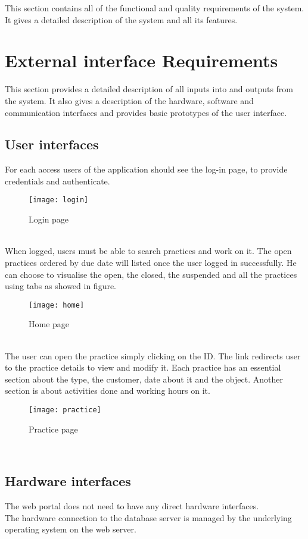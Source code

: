 \documentclass[../main.tex]{subfiles}
\begin{document}
	This section contains all of the functional and quality requirements of the system. It gives a detailed description of the system and all its features.
	\section{External interface Requirements}
		This section provides a detailed description of all inputs into and outputs from the system. It also gives a description of the hardware, software and communication interfaces and provides basic prototypes of the user interface.
	\subsection{User interfaces}
		For each access users of the application should see the log-in page, to provide credentials and authenticate.
		\begin{figure}[h]
			\centering
			\texttt{[image: login]}
			\caption{Login page}
		\end{figure}\\
		When logged, users must be able to search practices and work on it. The open practices ordered by due date will listed once the user logged in successfully. He can choose to visualise the open, the closed, the suspended and all the practices using tabs as showed in figure.
		\begin{figure}[h]
			\centering
			\texttt{[image: home]}
			\caption{Home page}
		\end{figure}\\
		The user can open the practice simply clicking on the ID. The link redirects user to the practice details to view and modify it. Each practice has an essential section about the type, the customer, date about it and the object. Another section is about activities done and working hours on it.\\
		\begin{figure}[h]
			\centering
			\texttt{[image: practice]}
			\caption{Practice page}
		\end{figure}\\
	\subsection{Hardware interfaces}
		The web portal does not need to have any direct hardware interfaces.\\
		The hardware connection to the database server is managed by the underlying operating system on the web server. 
\end{document}
